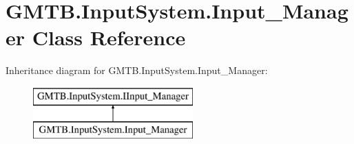 \hypertarget{class_g_m_t_b_1_1_input_system_1_1_input___manager}{}\section{G\+M\+T\+B.\+Input\+System.\+Input\+\_\+\+Manager Class Reference}
\label{class_g_m_t_b_1_1_input_system_1_1_input___manager}
Inheritance diagram for G\+M\+T\+B.\+Input\+System.\+Input\+\_\+\+Manager\+:\begin{figure}[H]
\begin{center}
\leavevmode
\includegraphics[height=2.000000cm]{class_g_m_t_b_1_1_input_system_1_1_input___manager}
\end{center}
\end{figure}
